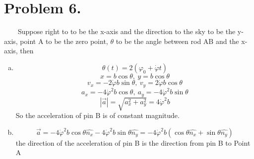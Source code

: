 \documentclass{article}
\begin{document}
\section*{Problem 6.}
	$\quad \quad$Suppose right to to be the x-axis and the direction to the sky to be the y-axis, point A to be the zero point, $\theta$ to be the angle between rod AB and the x-axis, then
	\begin{enumerate}[(a)]
	\item
		$$\theta(t)=2(\varphi_0+\dot{\varphi}t)$$
		$$x=b\cos\theta,\ y=b\cos\theta$$
		$$v_x=-2\dot{\varphi}b\sin\theta,\ v_y=2\dot{\varphi}b\cos\theta$$
		$$a_x=-4\dot{\varphi}^2b\cos\theta,\ a_y=-4\dot{\varphi}^2b\sin\theta$$
		$$|\vec{a}|=\sqrt{a_x^2+a_y^2}=4\dot{\varphi}^2b$$
		So the acceleration of pin B is of constant magnitude.
	\item
		$$\vec{a}=-4\dot{\varphi}^2b\cos\theta\hat{n_x}-4\dot{\varphi}^2b\sin\theta\hat{n_y}
		=-4\dot{\varphi}^2b(\cos\theta\hat{n_x}+\sin\theta\hat{n_y})$$
		the direction of the acceleration of pin B is the direction from pin B to Point A
	\end{enumerate}
\end{document}

